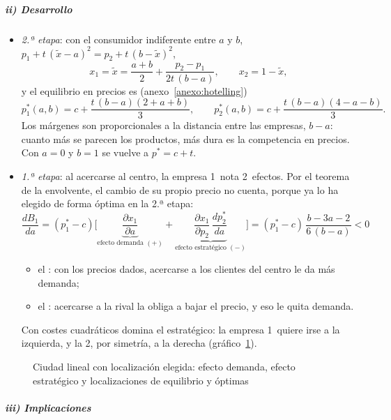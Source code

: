 \documentclass[11pt]{article}
\begin{document}
\subparagraph{ii) Desarrollo}

\begin{itemize}
\item \emph{2.ª etapa}: con el consumidor indiferente entre $a$ y $b$, $p_1+t\,(\tilde{x}-a)^2=p_2+t\,(b-\tilde{x})^2$,
  $$x_1=\tilde{x}=\frac{a+b}{2}+\frac{p_2-p_1}{2t\,(b-a)},\qquad x_2=1-\tilde{x},$$
  y el equilibrio en precios es (anexo~\ref{anexo:hotelling})
  $$p_1^*(a,b)=c+\frac{t\,(b-a)(2+a+b)}{3},\qquad p_2^*(a,b)=c+\frac{t\,(b-a)(4-a-b)}{3}.$$
  Los márgenes son proporcionales a la distancia entre las empresas, $b-a$: cuanto más se parecen los productos, más dura es la competencia en precios. Con $a=0$ y $b=1$ se vuelve a $p^*=c+t$.
\item \emph{1.ª etapa}: al acercarse al centro, la empresa 1~nota 2~efectos. Por el teorema de la envolvente, el cambio de su propio precio no cuenta, porque ya lo ha elegido de forma óptima en la 2.ª etapa:
  $$\frac{dB_1}{da}=(p_1^*-c)\Big[\underbrace{\frac{\partial x_1}{\partial a}}_{\text{efecto demanda }(+)}+\underbrace{\frac{\partial x_1}{\partial p_2}\,\frac{dp_2^*}{da}}_{\text{efecto estratégico }(-)}\Big]=(p_1^*-c)\,\frac{b-3a-2}{6\,(b-a)}<0$$
  \begin{itemize}
  \item el : con los precios dados, acercarse a los clientes del centro le da más demanda;
  \item el : acercarse a la rival la obliga a bajar el precio, y eso le quita demanda.
  \end{itemize}
  Con costes cuadráticos domina el estratégico: la empresa 1~quiere irse a la izquierda, y la 2, por simetría, a la derecha (gráfico~\ref{fig:hotelling-localizacion}).
\end{itemize}

\begin{figure}[H]
\centering
\caption{Ciudad lineal con localización elegida: efecto demanda, efecto estratégico y localizaciones de equilibrio y óptimas}\label{fig:hotelling-localizacion}
\end{figure}

\subparagraph{iii) Implicaciones}
\end{document}
